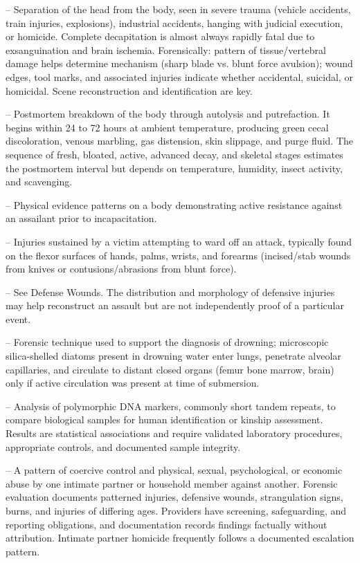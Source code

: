 -- Separation of the head from the body, seen in severe trauma (vehicle accidents, train injuries, explosions), industrial accidents, hanging with judicial execution, or homicide. Complete decapitation is almost always rapidly fatal due to exsanguination and brain ischemia. Forensically: pattern of tissue/vertebral damage helps determine mechanism (sharp blade vs. blunt force avulsion); wound edges, tool marks, and associated injuries indicate whether accidental, suicidal, or homicidal. Scene reconstruction and identification are key.

-- Postmortem breakdown of the body through autolysis and putrefaction. It begins within 24 to 72 hours at ambient temperature, producing green cecal discoloration, venous marbling, gas distension, skin slippage, and purge fluid. The sequence of fresh, bloated, active, advanced decay, and skeletal stages estimates the postmortem interval but depends on temperature, humidity, insect activity, and scavenging.

-- Physical evidence patterns on a body demonstrating active resistance against an assailant prior to incapacitation.

-- Injuries sustained by a victim attempting to ward off an attack, typically found on the flexor surfaces of hands, palms, wrists, and forearms (incised/stab wounds from knives or contusions/abrasions from blunt force).

-- See Defense Wounds. The distribution and morphology of defensive injuries may help reconstruct an assault but are not independently proof of a particular event.

-- Forensic technique used to support the diagnosis of drowning; microscopic silica-shelled diatoms present in drowning water enter lungs, penetrate alveolar capillaries, and circulate to distant closed organs (femur bone marrow, brain) only if active circulation was present at time of submersion.

-- Analysis of polymorphic DNA markers, commonly short tandem repeats, to compare biological samples for human identification or kinship assessment. Results are statistical associations and require validated laboratory procedures, appropriate controls, and documented sample integrity.

-- A pattern of coercive control and physical, sexual, psychological, or economic abuse by one intimate partner or household member against another. Forensic evaluation documents patterned injuries, defensive wounds, strangulation signs, burns, and injuries of differing ages. Providers have screening, safeguarding, and reporting obligations, and documentation records findings factually without attribution. Intimate partner homicide frequently follows a documented escalation pattern.



